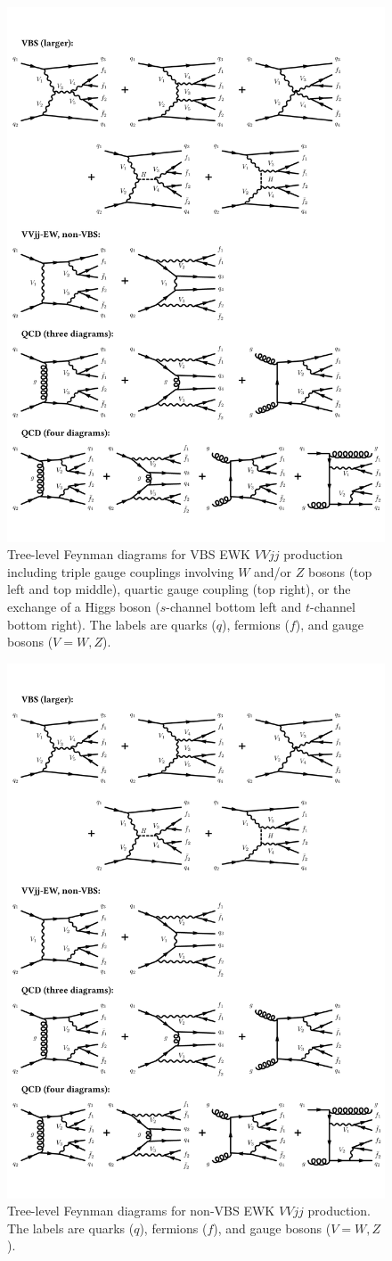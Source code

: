 \begin{figure}[htbp]
  \centering
  \includegraphics[width=.8\textwidth]{figs/ssww_13tev/diagrams/Vbscore}
  \caption{Tree-level Feynman diagrams for VBS EWK $VVjj$ production including triple gauge couplings involving $W$ and/or $Z$ bosons (top left and top middle), quartic gauge coupling (top right), or the exchange of a Higgs boson ($s$-channel bottom left and $t$-channel bottom right).  The labels are quarks ($q$), fermions ($f$), and gauge bosons ($V = W,Z$).}
  \label{fig:ssww13tev_diagrams_vbs}
\end{figure}

\begin{figure}[htbp]
  \centering
  \includegraphics[width=.54\textwidth]{figs/ssww_13tev/diagrams/NoVbsEW}
  \caption{Tree-level Feynman diagrams for non-VBS EWK $VVjj$ production.  The labels are quarks ($q$), fermions ($f$), and gauge bosons ($V = W,Z$).}
  \label{fig:ssww13tev_diagrams_ewk}
\end{figure}


